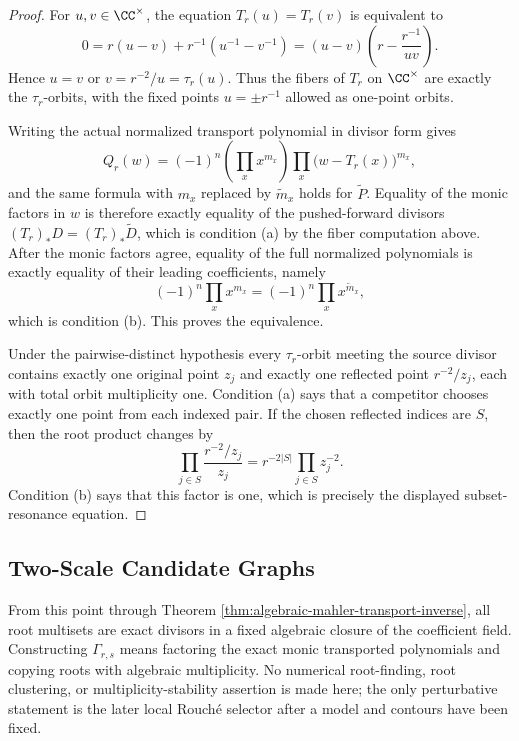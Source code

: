 \begin{proof}
For \(u,v\in\CC^\times\), the equation \(T_r(u)=T_r(v)\) is equivalent to
\[
0=r(u-v)+r^{-1}(u^{-1}-v^{-1})=(u-v)\left(r-\frac{r^{-1}}{uv}\right).
\]
Hence \(u=v\) or \(v=r^{-2}/u=\tau_r(u)\).  Thus the fibers of \(T_r\) on \(\CC^\times\) are exactly the \(\tau_r\)-orbits, with the fixed points \(u=\pm r^{-1}\) allowed as one-point orbits.

Writing the actual normalized transport polynomial in divisor form gives
\[
Q_r(w)=(-1)^n\left(\prod_x x^{m_x}\right)
\prod_x\bigl(w-T_r(x)\bigr)^{m_x},
\]
and the same formula with \(m_x\) replaced by \(\widetilde m_x\) holds for \(\widetilde P\).  Equality of the monic factors in \(w\) is therefore exactly equality of the pushed-forward divisors \((T_r)_\ast D=(T_r)_\ast\widetilde D\), which is condition \textup{(a)} by the fiber computation above.  After the monic factors agree, equality of the full normalized polynomials is exactly equality of their leading coefficients, namely
\[
(-1)^n\prod_xx^{m_x}=(-1)^n\prod_xx^{\widetilde m_x},
\]
which is condition \textup{(b)}.  This proves the equivalence.

Under the pairwise-distinct hypothesis every \(\tau_r\)-orbit meeting the source divisor contains exactly one original point \(z_j\) and exactly one reflected point \(r^{-2}/z_j\), each with total orbit multiplicity one.  Condition \textup{(a)} says that a competitor chooses exactly one point from each indexed pair.  If the chosen reflected indices are \(S\), then the root product changes by
\[
\prod_{j\in S}\frac{r^{-2}/z_j}{z_j}
=r^{-2|S|}\prod_{j\in S}z_j^{-2}.
\]
Condition \textup{(b)} says that this factor is one, which is precisely the displayed subset-resonance equation.
\end{proof}


\subsection{Two-Scale Candidate Graphs}\label{subsec:two-scale-candidate-graphs}

From this point through Theorem
\ref{thm:algebraic-mahler-transport-inverse}, all root multisets are
exact divisors in a fixed algebraic closure of the coefficient field.
Constructing \(\Gamma_{r,s}\) means factoring the exact monic transported
polynomials and copying roots with algebraic multiplicity.  No numerical
root-finding, root clustering, or multiplicity-stability assertion is
made here; the only perturbative statement is the later local Rouch\'e
selector after a model and contours have been fixed.

